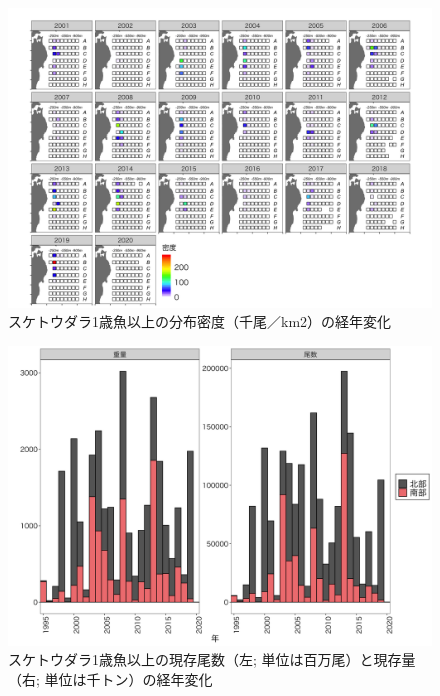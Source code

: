 \documentclass[11pt]{article} %
\begin{document}
\begin{linenumbers}
\begin{figure}[h]
  \centering
  \includegraphics[width = 14cm]{スケトウダラ０＋dens.png}
  \caption{スケトウダラ1歳魚以上の分布密度（千尾／km2）の経年変化}
\end{figure}

\begin{figure}[h]
  \centering
  \includegraphics[width = 14cm]{スケトウダラ０＋trend.png}
  \caption{スケトウダラ1歳魚以上の現存尾数（左; 単位は百万尾）と現存量（右; 単位は千トン）の経年変化}
\end{figure}


\end{linenumbers}
\end{document}
